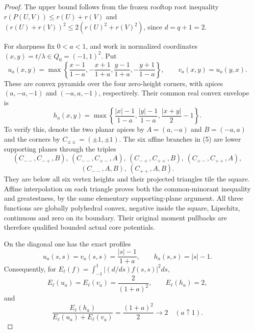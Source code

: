 \documentclass{article}
\begin{document}
\begin{proof}
The upper bound follows from the frozen rooftop root inequality
$r(P(U,V))\le r(U)+r(V)$ and
$(r(U)+r(V))^2\le2(r(U)^2+r(V)^2)$, since $d=q+1=2$.

For sharpness fix $0<a<1$, and work in normalized coordinates
$(x,y)=t/\lambda\in Q_0=(-1,1)^2$. Put
\[
 u_a(x,y)=\max\left\{
 \frac{x-1}{1-a},-\frac{x+1}{1+a},
 \frac{y-1}{1+a},-\frac{y+1}{1-a}\right\},
 \qquad v_a(x,y)=u_a(y,x).
\]
These are convex pyramids over the four zero-height corners, with apices
$(a,-a,-1)$ and $(-a,a,-1)$, respectively. Their common real convex
envelope is
\[
 h_a(x,y)=\max\left\{
 \frac{|x|-1}{1-a},\frac{|y|-1}{1-a},\frac{|x+y|}{2}-1
                         \right\}.                         \tag{5}
\]
To verify this, denote the two planar apices by $A=(a,-a)$ and
$B=(-a,a)$ and the corners by $C_{\pm\pm}=(\pm1,\pm1)$.
The six affine branches in (5) are lower supporting planes through
the triples
\[
 (C_{--},C_{-+},B),\ (C_{--},C_{+-},A),\
 (C_{-+},C_{++},B),\ (C_{+-},C_{++},A),
\]
\[
                   (C_{--},A,B),\ (C_{++},A,B).
\]
They are below all six vertex heights and their projected triangles
tile the square. Affine interpolation on each triangle proves both
the common-minorant inequality and greatestness, by the same elementary supporting-plane argument. All three functions are
globally polyhedral convex, negative inside the square, Lipschitz,
continuous and zero on its boundary. Their original moment pullbacks
are therefore qualified bounded actual core potentials.

On the diagonal one has the exact profiles
\[
 u_a(s,s)=v_a(s,s)=\frac{|s|-1}{1+a},\qquad
 h_a(s,s)=|s|-1.
\]
Consequently, for $E_\ell(f)=\int_{-1}^1|(d/ds)f(s,s)|^2ds$,
\[
 E_\ell(u_a)=E_\ell(v_a)=\frac2{(1+a)^2},\qquad
 E_\ell(h_a)=2,
\]
and
\[
 \frac{E_\ell(h_a)}{E_\ell(u_a)+E_\ell(v_a)}
                         =\frac{(1+a)^2}{2}\longrightarrow2
                         \quad(a\uparrow1).                \tag{6}
\]


\end{proof}
\end{document}
